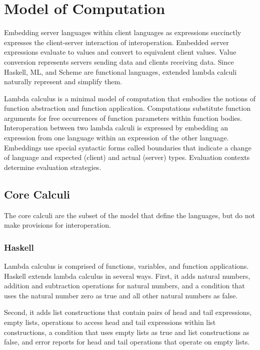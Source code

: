 \chapter{Model of Computation}

Embedding server languages within client languages as expressions succinctly expresses the client-server interaction of interoperation.  Embedded server expressions evaluate to values and convert to equivalent client values.  Value conversion represents servers sending data and clients receiving data.  Since Haskell, ML, and Scheme are functional languages, extended lambda calculi naturally represent and simplify them.

Lambda calculus is a minimal model of computation that embodies the notions of function abstraction and function application.  Computations substitute function arguments for free occurrences of function parameters within function bodies.  Interoperation between two lambda calculi is expressed by embedding an expression from one language within an expression of the other language.  Embeddings use special syntactic forms called boundaries that indicate a change of language and expected (client) and actual (server) types.  Evaluation contexts determine evaluation strategies.

\section{Core Calculi}

The core calculi are the subset of the model that define the languages, but do not make provisions for interoperation.

\subsection{Haskell}

Lambda calculus is comprised of functions, variables, and function applications.  Haskell extends lambda calculus in several ways.  First, it adds natural numbers, addition and subtraction operations for natural numbers, and a condition that uses the natural number zero as true and all other natural numbers as false.

Second, it adds list constructions that contain pairs of head and tail expressions, empty lists, operations to access head and tail expressions within list constructions, a condition that uses empty lists as true and list constructions as false, and error reports for head and tail operations that operate on empty lists.

